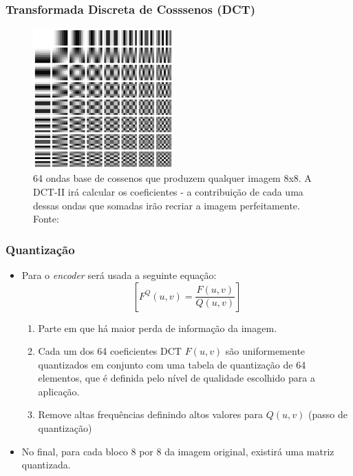 \documentclass{beamer}
\begin{document}
\begin{frame}
\frametitle{Transformada Discreta de Cosssenos (DCT)}
\begin{figure}
\includegraphics[width=0.48\textwidth]{figs/DCT-8x8.png}
\caption{64 ondas base de cossenos que produzem qualquer imagem 8x8. A DCT-II irá calcular os coeficientes - a contribuição de cada uma dessas ondas que somadas irão recriar a imagem perfeitamente. Fonte:~\cite{dct}}
\end{figure}
\end{frame}
\newcommand\round[1]{\left[#1\right]}
\begin{frame}
\frametitle{Quantização}
\begin{itemize}
\item Para o \textit{encoder} será usada a seguinte equação:
\begin{equation}\round{F^Q(u,v) = \dfrac{F(u,v)}{Q(u,v)}}\end{equation}
\begin{enumerate}
\item Parte em que há maior perda de informação da imagem.
\item Cada um dos 64 coeficientes DCT $F(u,v)$ são uniformemente quantizados em conjunto com uma tabela de quantização de 64 elementos, que é definida pelo nível de qualidade escolhido para a aplicação.
\item Remove altas frequências definindo altos valores para $Q(u,v)$ (passo de quantização)
\end{enumerate}
\item No final, para cada bloco 8 por 8 da imagem original, existirá uma matriz quantizada.
\end{itemize}
\end{frame}
\end{document}
